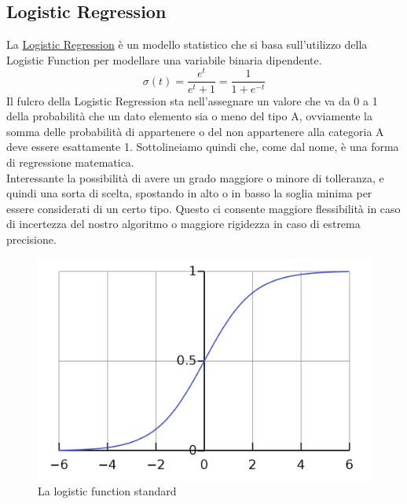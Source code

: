 \subsection{Logistic Regression}
La \href{https://en.wikipedia.org/wiki/Logistic_regression}{Logistic Regression}  è un modello statistico che si basa sull'utilizzo della Logistic Function per modellare una variabile binaria dipendente.
\begin{equation}
\sigma (t)={\frac {e^{t}}{e^{t}+1}}={\frac {1}{1+e^{-t}}}
\end{equation}
Il fulcro della Logistic Regression sta nell'assegnare un valore che va da 0 a 1 della probabilità che un dato elemento sia o meno del tipo A, ovviamente la somma delle probabilità di appartenere o del non appartenere alla categoria A deve essere esattamente 1. Sottolineiamo quindi che, come dal nome, è una forma di regressione matematica.\\ Interessante la possibilità di avere un grado maggiore o minore di tolleranza, e quindi una sorta di scelta, spostando in alto o in basso la soglia minima per essere considerati di un certo tipo. Questo ci consente maggiore flessibilità in caso di incertezza del nostro algoritmo o maggiore rigidezza in caso di estrema precisione.
\begin{figure}[H]
\centering
\includegraphics[scale=0.25]{img/logisticFunction.png}
\caption{La logistic function standard}
\end{figure}
